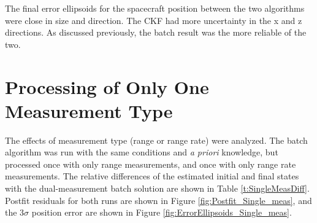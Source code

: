 \documentclass[]{aiaa-tc}%
\begin{document}
	\vspace{5 mm}

	The final error ellipsoids for the spacecraft position between the two algorithms were close in size and direction.  The CKF had more uncertainty in the x and z directions. As discussed previously, the batch result was the more reliable of the two.
	
	\section{Processing of Only One Measurement Type}
	
	The effects of measurement type (range or range rate) were analyzed.  The batch algorithm was run with the same conditions and \textit{a priori} knowledge, but processed once with only range measurements, and once with only range rate measurements.  The relative differences of the estimated initial and final states with the dual-measurement batch solution are shown in Table \ref{t:SingleMeasDiff}.  Postfit residuals for both runs are shown in Figure \ref{fig:Postfit_Single_meas}, and the 3$\sigma$ position error are shown in Figure \ref{fig:ErrorEllipsoids_Single_meas}.
\end{document}
